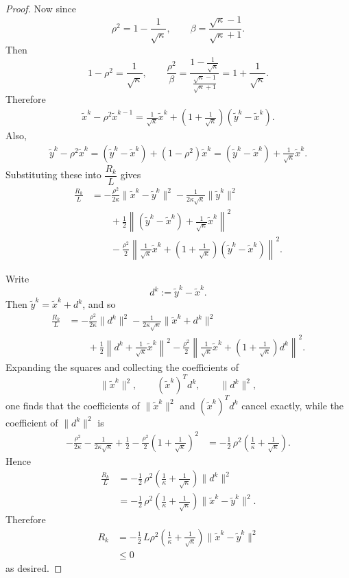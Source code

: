 \begin{proof}
Now since
\[
\rho^2=1-\frac{1}{\sqrt\kappa},
\qquad
\beta=\frac{\sqrt\kappa-1}{\sqrt\kappa+1}.
\]
Then
\[
1-\rho^2=\frac{1}{\sqrt\kappa},
\qquad
\frac{\rho^2}{\beta}
=
\frac{1-\frac{1}{\sqrt\kappa}}{\frac{\sqrt\kappa-1}{\sqrt\kappa+1}}
=
1+\frac{1}{\sqrt\kappa}.
\]
Therefore
\begin{align*}
\tilde x^k-\rho^2\tilde x^{k-1}
=
\frac{1}{\sqrt\kappa}\tilde x^k
+\left(1+\frac{1}{\sqrt\kappa}\right)(\tilde y^k-\tilde x^k).
\end{align*}
Also,
\begin{align*}
\tilde y^k-\rho^2\tilde x^k
=
(\tilde y^k-\tilde x^k)+(1-\rho^2)\tilde x^k
=
(\tilde y^k-\tilde x^k)+\frac{1}{\sqrt\kappa}\tilde x^k.
\end{align*}
Substituting these into $\dfrac{R_k}{L}$ gives
\begin{align*}
\frac{R_k}{L}
&=
-\frac{\rho^2}{2\kappa}\|\tilde x^k-\tilde y^k\|^2
-\frac{1}{2\kappa\sqrt\kappa}\|\tilde y^k\|^2 \\
&\qquad
+\frac12\left\|(\tilde y^k-\tilde x^k)+\frac{1}{\sqrt\kappa}\tilde x^k\right\|^2 \\
&\qquad
-\frac{\rho^2}{2}
\left\|
\frac{1}{\sqrt\kappa}\tilde x^k
+\left(1+\frac{1}{\sqrt\kappa}\right)(\tilde y^k-\tilde x^k)
\right\|^2.
\end{align*}

Write
\[
d^k:=\tilde y^k-\tilde x^k.
\]
Then $\tilde y^k=\tilde x^k+d^k$, and so
\begin{align*}
\frac{R_k}{L}
&=
-\frac{\rho^2}{2\kappa}\|d^k\|^2
-\frac{1}{2\kappa\sqrt\kappa}\|\tilde x^k+d^k\|^2 \\
&\qquad
+\frac12\left\|d^k+\frac{1}{\sqrt\kappa}\tilde x^k\right\|^2
-\frac{\rho^2}{2}
\left\|
\frac{1}{\sqrt\kappa}\tilde x^k
+\left(1+\frac{1}{\sqrt\kappa}\right)d^k
\right\|^2.
\end{align*}
Expanding the squares and collecting the coefficients of
\[
\|\tilde x^k\|^2,\qquad
(\tilde x^k)^Td^k,\qquad
\|d^k\|^2,
\]
one finds that the coefficients of $\|\tilde x^k\|^2$ and $(\tilde x^k)^Td^k$ cancel exactly, while the coefficient of $\|d^k\|^2$ is
\begin{align*}
-\frac{\rho^2}{2\kappa}
-\frac{1}{2\kappa\sqrt\kappa}
+\frac12
-\frac{\rho^2}{2}\left(1+\frac{1}{\sqrt\kappa}\right)^2
&=
-\frac12\,\rho^2\left(\frac1\kappa+\frac1{\sqrt\kappa}\right).
\end{align*}
Hence
\begin{align*}
\frac{R_k}{L}
&=
-\frac12\,\rho^2\left(\frac1\kappa+\frac1{\sqrt\kappa}\right)\|d^k\|^2 \\
&=
-\frac12\,\rho^2\left(\frac1\kappa+\frac1{\sqrt\kappa}\right)\|\tilde x^k-\tilde y^k\|^2.
\end{align*}
Therefore
\begin{align*}
R_k
&=
-\frac12\,L\rho^2\left(\frac1\kappa+\frac1{\sqrt\kappa}\right)\|\tilde x^k-\tilde y^k\|^2 \\
&\le 0
\end{align*}
as desired.
\end{proof}

